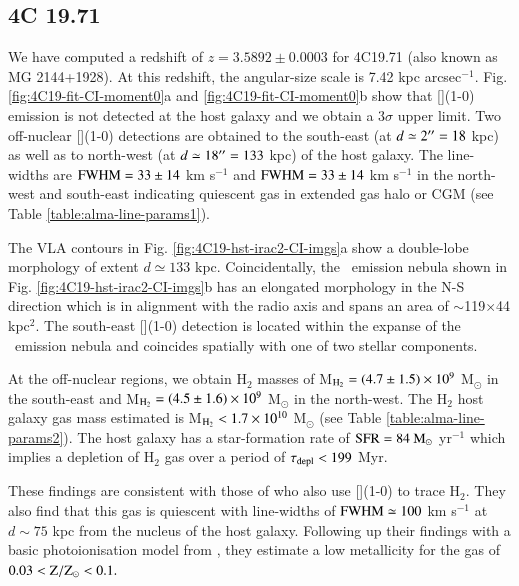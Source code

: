 \subsection{4C 19.71}

We have computed a redshift of $z=3.5892 \pm 0.0003$ for 4C19.71 (also known as MG 2144+1928). At this redshift, the angular-size scale is 7.42 kpc arcsec$^{-1}.$ Fig. \ref{fig:4C19-fit-CI-moment0}a and \ref{fig:4C19-fit-CI-moment0}b show that [](1-0) emission is not detected at the host galaxy and we obtain a $3\sigma$ upper limit. Two off-nuclear [](1-0) detections are obtained to the south-east (at $d\simeq2^{\prime\prime}=18$ kpc) as well as to north-west (at $d\simeq18^{\prime\prime}=133$ kpc) of the host galaxy. The line-widths are $\rm FWHM = 33\pm14$ km s$^{-1}$ and $\rm FWHM = 33\pm14$ km s$^{-1}$ in the north-west and south-east indicating quiescent gas in extended gas halo or CGM (see Table \ref{table:alma-line-params1}). 

The VLA contours in Fig. \ref{fig:4C19-hst-irac2-CI-imgs}a show a double-lobe morphology of extent $d\simeq133$ kpc. Coincidentally, the \lya~emission nebula shown in Fig. \ref{fig:4C19-hst-irac2-CI-imgs}b has an elongated morphology in the N-S direction which is in alignment with the radio axis and spans an area of $\sim$119$\times$44 kpc$^2.$ The south-east [](1-0) detection is located within the expanse of the \lya~emission nebula and coincides spatially with one of two stellar components. 

At the off-nuclear regions, we obtain H$_2$ masses of M$_{\rm H_2} = (4.7\pm1.5)\times 10^{9}$ M$_\odot$ in the south-east and M$_{\rm H_2} = (4.5\pm1.6)\times 10^{9}$ M$_\odot$ in the north-west. The H$_2$ host galaxy gas mass estimated is M$_{\rm H_2}<1.7\times 10^{10}$ M$_\odot$ (see Table \ref{table:alma-line-params2}). The host galaxy has a star-formation rate of $\rm SFR = 84~M_\odot$ yr$^{-1}$ which implies a depletion of H$_2$ gas over a period of $\tau_{\rm depl} < 199$ Myr. 

These findings are consistent with those of \citet{falkendal2019-submitted} who also use [](1-0) to trace H$_2.$ They also find that this gas is quiescent with line-widths of $\rm FWHM\simeq 100$ km s$^{-1}$ at $d\sim75$ kpc from the nucleus of the host galaxy. Following up their findings with a basic photoionisation model from  \citep{Ferland2013}, they estimate a low metallicity for the gas of  $\rm 0.03 < Z/Z_\odot < 0.1.$ 

